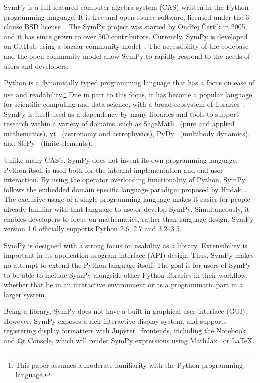 SymPy is a full featured computer algebra system (CAS) written in the
Python~\cite{lutz2013learning}
programming language.
It is free and open source software, licensed under the 3-clause BSD
license~\cite{rosen2005open}.
The SymPy project was started by Ond\v{r}ej \v{C}ert\'{\i}k in 2005, and it has
since grown to over 500 contributors. Currently, SymPy is
developed on GitHub using a bazaar community
model~\cite{raymond1999cathedral}. The accessibility of the codebase and the
open community model allow SymPy to rapidly respond to the needs of
users and developers.

Python is a dynamically typed programming language that has a focus on
ease of use and readability.\footnote{\label{note:python}This paper assumes a moderate
  familiarity with the Python programming language.} Due in part to this focus, it has become a popular
language for scientific
computing and data science, with a broad ecosystem of
libraries~\cite{oliphant2007python}. SymPy is itself used as a dependency
by many libraries
and tools to support research within a variety of domains, such as
SageMath~\cite{sagemath} (pure and applied mathematics),
yt~\cite{2011ApJS..192....9T} (astronomy and astrophysics),
PyDy~\cite{gede2013constrained} (multibody dynamics), and
SfePy~\cite{cimrman2014sfepy} (finite elements).

Unlike many CAS's, SymPy does not invent its own programming language. Python
itself is used both for the internal implementation and end user
interaction. By using the operator overloading functionality of Python, SymPy follows the embedded domain specific language paradigm proposed by Hudak~\cite{dsl-little-languages}.  The exclusive usage of a single programming language makes it easier
for people already familiar with that language to use or develop SymPy.
Simultaneously, it enables developers to focus on mathematics, rather than
language design.  SymPy version 1.0 officially supports Python 2.6, 2.7 and 3.2--3.5.

SymPy is designed with a strong focus on usability as a library.
Extensibility is important in its application program interface
(API) design. Thus, SymPy makes no attempt to extend
the Python language itself. The goal is for users of SymPy to be able to
include SymPy alongside other Python libraries in their workflow, whether that
be in an interactive environment or as a programmatic part in a larger system.

Being a library, SymPy does not have a built-in graphical user interface (GUI).
However, SymPy exposes a rich interactive display system, and supports
registering display formatters with Jupyter~\cite{kluyver2016jupyter} frontends,
including the Notebook and Qt Console, which will render SymPy expressions
using MathJax~\cite{cervone2012mathjax} or \LaTeX{}.

